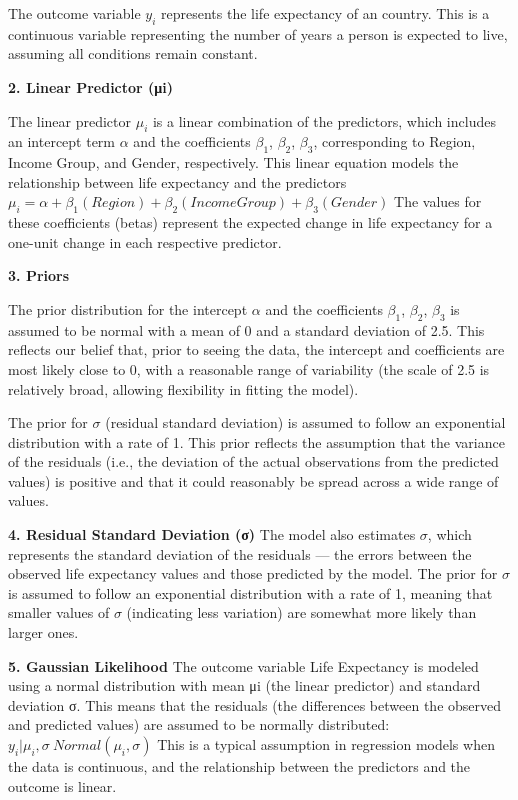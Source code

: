 \documentclass[
  letterpaper,
  DIV=11,
  numbers=noendperiod]{scrartcl}
\begin{document}
The outcome variable \(y_i\) represents the life expectancy of an
country. This is a continuous variable representing the number of years
a person is expected to live, assuming all conditions remain constant.

\textbf{2. Linear Predictor (μi)}

The linear predictor \(μ_i\) is a linear combination of the predictors,
which includes an intercept term \(α\) and the coefficients \(β_1\),
\(β_2\), \(β_3\), corresponding to Region, Income Group, and Gender,
respectively. This linear equation models the relationship between life
expectancy and the predictors
\(\mu_i = \alpha + \beta_1(Region) + \beta_2(Income Group) + \beta_3 (Gender)\)
The values for these coefficients (betas) represent the expected change
in life expectancy for a one-unit change in each respective predictor.

\textbf{3. Priors}

The prior distribution for the intercept \(α\) and the coefficients
\(β_1\), \(β_2\), \(β_3\) is assumed to be normal with a mean of 0 and a
standard deviation of 2.5. This reflects our belief that, prior to
seeing the data, the intercept and coefficients are most likely close to
0, with a reasonable range of variability (the scale of 2.5 is
relatively broad, allowing flexibility in fitting the model).

The prior for \(σ\) (residual standard deviation) is assumed to follow
an exponential distribution with a rate of 1. This prior reflects the
assumption that the variance of the residuals (i.e., the deviation of
the actual observations from the predicted values) is positive and that
it could reasonably be spread across a wide range of values.

\textbf{4. Residual Standard Deviation (σ)} The model also estimates
\(σ\), which represents the standard deviation of the residuals --- the
errors between the observed life expectancy values and those predicted
by the model. The prior for \(σ\) is assumed to follow an exponential
distribution with a rate of 1, meaning that smaller values of \(σ\)
(indicating less variation) are somewhat more likely than larger ones.

\textbf{5. Gaussian Likelihood} The outcome variable Life Expectancy is
modeled using a normal distribution with mean μi (the linear predictor)
and standard deviation σ. This means that the residuals (the differences
between the observed and predicted values) are assumed to be normally
distributed: \(y_i| \mu_i, \sigma ~ Normal(\mu_i, \sigma)\) This is a
typical assumption in regression models when the data is continuous, and
the relationship between the predictors and the outcome is linear.
\end{document}
